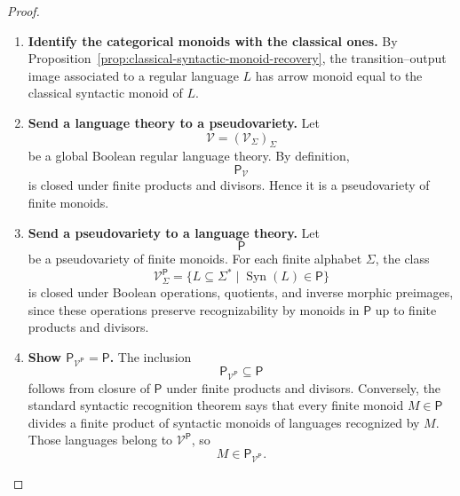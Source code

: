 \begin{proof}
    \leavevmode
    \begin{enumerate}
        \item \textbf{Identify the categorical monoids with the classical ones.}
        By Proposition~\ref{prop:classical-syntactic-monoid-recovery}, the
        transition--output image associated to a regular language \(L\) has
        arrow monoid equal to the classical syntactic monoid of \(L\).

        \item \textbf{Send a language theory to a pseudovariety.}
        Let
        \[
            \mathcal V=(\mathcal V_\Sigma)_\Sigma
        \]
        be a global Boolean regular language theory. By definition,
        \[
            \mathsf P_{\mathcal V}
        \]
        is closed under finite products and divisors. Hence it is a
        pseudovariety of finite monoids.

        \item \textbf{Send a pseudovariety to a language theory.}
        Let
        \[
            \mathsf P
        \]
        be a pseudovariety of finite monoids. For each finite alphabet
        \(\Sigma\), the class
        \[
            \mathcal V^{\mathsf P}_\Sigma
            =
            \{L\subseteq\Sigma^*
              \mid
              \operatorname{Syn}(L)\in\mathsf P\}
        \]
        is closed under Boolean operations, quotients, and inverse morphic
        preimages, since these operations preserve recognizability by monoids
        in \(\mathsf P\) up to finite products and divisors.

        \item \textbf{Show \(\mathsf P_{\mathcal V^{\mathsf P}}=\mathsf P\).}
        The inclusion
        \[
            \mathsf P_{\mathcal V^{\mathsf P}}\subseteq\mathsf P
        \]
        follows from closure of \(\mathsf P\) under finite products and
        divisors. Conversely, the standard syntactic recognition theorem says
        that every finite monoid \(M\in\mathsf P\) divides a finite product of
        syntactic monoids of languages recognized by \(M\). Those languages
        belong to \(\mathcal V^{\mathsf P}\), so
        \[
            M\in\mathsf P_{\mathcal V^{\mathsf P}}.
        \]


\end{enumerate}
\end{proof}
